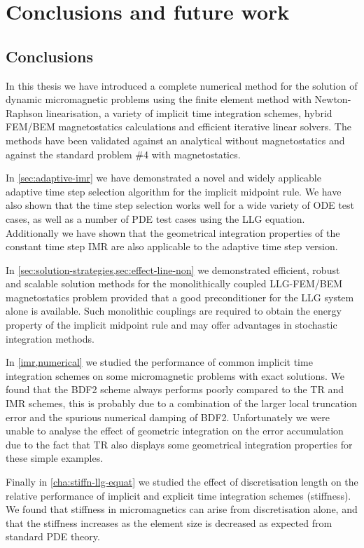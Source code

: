 \chapter{Conclusions and future work}

\section{Conclusions}

In this thesis we have introduced a complete numerical method for the solution of dynamic micromagnetic problems using the finite element method with Newton-Raphson linearisation, a variety of implicit time integration schemes, hybrid FEM/BEM magnetostatics calculations and efficient iterative linear solvers.
The methods have been validated against an analytical without magnetostatics and against the \mumag standard problem \#4 with magnetostatics.

In \cref{sec:adaptive-imr} we have demonstrated a novel and widely applicable adaptive time step selection algorithm for the implicit midpoint rule.
We have also shown that the time step selection works well for a wide variety of ODE test cases, as well as a number of PDE test cases using the LLG equation.
Additionally we have shown that the geometrical integration properties of the constant time step IMR are also applicable to the adaptive time step version.

In \cref{sec:solution-strategies,sec:effect-line-non} we demonstrated efficient, robust and scalable solution methods for the monolithically coupled LLG-FEM/BEM magnetostatics problem provided that a good preconditioner for the LLG system alone is available.
Such monolithic couplings are required to obtain the energy property of the implicit midpoint rule and may offer advantages in stochastic integration methods.

In \cref{imr,numerical} we studied the performance of common implicit time integration schemes on some micromagnetic problems with exact solutions.
We found that the BDF2 scheme always performs poorly compared to the TR and IMR schemes, this is probably due to a combination of the larger local truncation error and the spurious numerical damping of BDF2.
Unfortunately we were unable to analyse the effect of geometric integration on the error accumulation due to the fact that TR also displays some geometrical integration properties for these simple examples.

Finally in \cref{cha:stiffn-llg-equat} we studied the effect of discretisation length on the relative performance of implicit and explicit time integration schemes (stiffness).
We found that stiffness in micromagnetics can arise from discretisation alone, and that the stiffness increases as the element size is decreased as expected from standard PDE theory.



